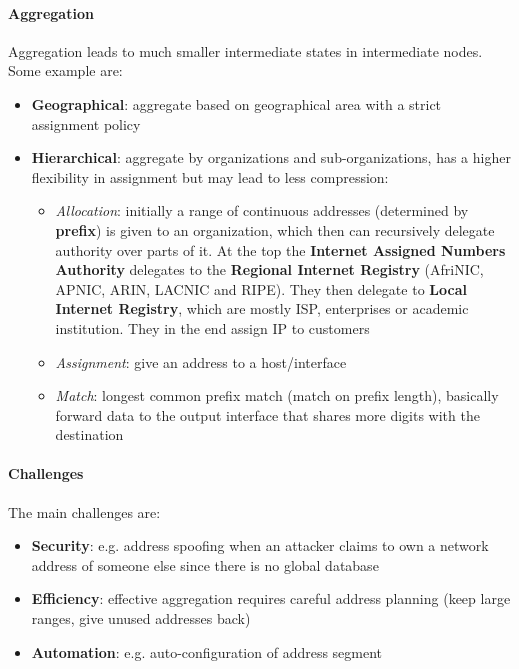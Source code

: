 \paragraph{Aggregation} Aggregation leads to much smaller intermediate states in intermediate nodes. Some example are:
\begin{itemize}
	\item \textbf{Geographical}: aggregate based on geographical area with a strict assignment policy
	\item \textbf{Hierarchical}: aggregate by organizations and sub-organizations, has a higher flexibility in assignment but may lead to less compression:
	\begin{itemize}
		\item \textit{Allocation}: initially a range of continuous addresses (determined by \textbf{prefix}) is given to an organization, which then can recursively delegate authority over parts of it. At the top the \textbf{Internet Assigned Numbers Authority} delegates to the \textbf{Regional Internet Registry} (AfriNIC, APNIC, ARIN, LACNIC and RIPE). They then delegate to \textbf{Local Internet Registry}, which are mostly ISP, enterprises or academic institution. They in the end assign IP to customers
		\item \textit{Assignment}: give an address to a host/interface
		\item \textit{Match}: longest common prefix match (match on prefix length), basically forward data to the output interface that shares more digits with the destination
	\end{itemize}
\end{itemize}

\paragraph{Challenges} The main challenges are:
\begin{itemize}
	\item \textbf{Security}: e.g. address spoofing when an attacker claims to own a network address of someone else since there is no global database
	\item \textbf{Efficiency}: effective aggregation requires careful address planning (keep large ranges, give unused addresses back)
	\item \textbf{Automation}: e.g. auto-configuration of address segment
\end{itemize}

